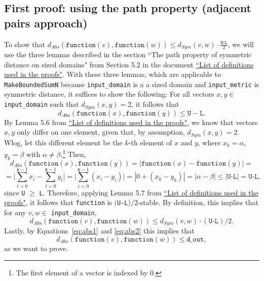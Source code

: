 \documentclass[11pt,a4paper]{article}
\theoremstyle{definition}
\newcommand{\dout}{\texttt{d\_out}}
\newcommand{\function}{\texttt{function}}
\newcommand{\silvia}[1]{{ {\color{blue}{(silvia)~#1}}}}
\begin{document}
\subsection{First proof: using the path property (adjacent pairs approach)}

To show that $d_{Abs}(\function(v), \function(w)) \leq d_{Sym}(v, w) \cdot \frac{\texttt{U-L}}{2}$, we will use the three lemmas described in the section ``The path property of symmetric distance on sized domains" from Section 5.2 in the document \href{https://www.overleaf.com/project/60d214e390b337703d200982}{``List of definitions used in the proofs"}. With these three lemmas, which are applicable to \texttt{MakeBoundedSumN} because \texttt{input\_domain} is a a sized domain and \texttt{input\_metric} is symmetric distance, it suffices to show the following: For all vectors $x, y \in$ \texttt{input\_domain} such that $d_{Sym}(x, y) = 2$, it follows that 
\[
d_{Abs}(\texttt{function}(x), \texttt{function}(y)) \leq \texttt{U} - \texttt{L}.
\]
By Lemma 5.6 from \href{https://www.overleaf.com/project/60d214e390b337703d200982}{``List of definitions used in the proofs"}, we know that vectors $x, y$ only differ on one element, given that, by assumption, $d_{Sym}(x, y) = 2$. Wlog, let this different element be the $k$-th element of $x$ and $y$, where $x_k = \alpha$, $y_k = \beta$ with $\alpha \neq \beta$.\footnote{The first element of a vector is indexed by 0.} Then,
\[
    d_{Abs}(\texttt{function}(x), \texttt{function}(y)) = |\texttt{function}(x) - \texttt{function}(y)| = 
\]
\[
    = \Big|\sum_{i=0}^{\texttt{n}-1}x_i - \sum_{i=0}^{\texttt{n}-1}y_i\Big| = \Big| \sum_{i=0}^{\texttt{n}-1} (x_i - y_i) \Big| = |0 + (x_k - y_k)| = |\alpha - \beta| \leq |\texttt{U-L}| = \texttt{U-L},
\]
since \texttt{U} $\geq$ \texttt{L}. Therefore, applying Lemma 5.7 from \href{https://www.overleaf.com/project/60d214e390b337703d200982}{``List of definitions used in the proofs"}, it follows that \texttt{function} is $($\texttt{U-L}$)/2$-stable. By definition, this implies that for any $v, w \in$ \texttt{input\_domain},
\[
    d_{Abs}(\texttt{function}(v), \texttt{function}(w)) \leq d_{Sym}(v, w) \cdot (\texttt{U-L})/2.
\]
Lastly, by Equations~\ref{eq:abs1} and \ref{eq:abs2} this implies that
\[
    d_{Abs}(\function(v), \function(w)) \leq \dout,
\]
as we want to prove.

\end{document}
